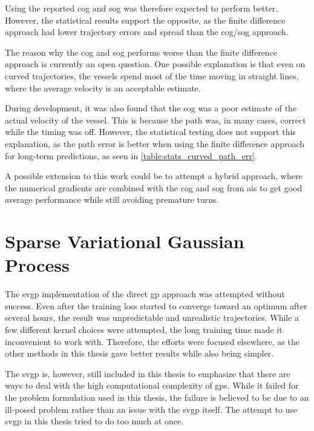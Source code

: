 Using the reported \acrshort{cog} and \acrshort{sog} was therefore expected to perform better. However, the statistical results support the opposite, as the finite difference approach had lower trajectory errors and spread than the \acrshort{cog}/\acrshort{sog} approach. 

The reason why the \acrshort{cog} and \acrshort{sog} performs worse than the finite difference approach is currently an open question. One possible explanation is that even on curved trajectories, the vessels spend most of the time moving in straight lines, where the average velocity is an acceptable estimate.

During development, it was also found that the \acrshort{sog} was a poor estimate of the actual velocity of the vessel. This is because the path was, in many cases, correct while the timing was off. However, the statistical testing does not support this explanation, as the path error is better when using the finite difference approach for long-term predictions, as seen in \cref{table:stats_curved_path_err}.

A possible extension to this work could be to attempt a hybrid approach, where the numerical gradients are combined with the \acrshort{cog} and \acrshort{sog} from \acrshort{ais} to get good average performance while still avoiding premature turns. 


\section{Sparse Variational Gaussian Process}
The \acrshort{svgp} implementation of the direct \acrshort{gp} approach was attempted without success. Even after the training loss started to converge toward an optimum after several hours, the result was unpredictable and unrealistic trajectories. While a few different kernel choices were attempted, the long training time made it inconvenient to work with. Therefore, the efforts were focused elsewhere, as the other methods in this thesis gave better results while also being simpler. 

The \acrshort{svgp} is, however, still included in this thesis to emphasize that there are ways to deal with the high computational complexity of \acrshort{gp}s. While it failed for the problem formulation used in this thesis, the failure is believed to be due to an ill-posed problem rather than an issue with the \acrshort{svgp} itself. The attempt to use \acrshort{svgp} in this thesis tried to do too much at once.